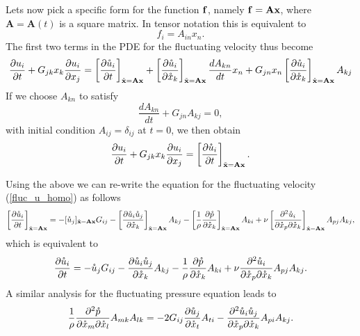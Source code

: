 \documentclass[oneside,a4paper,11pt]{report}
\begin{document}
Lets now pick a specific form for the function $\mathbf{f}$, namely $\mathbf{f} = \mathbf{A}\mathbf{x}$, where $\mathbf{A} = \mathbf{A}(t)$ is a square matrix. In tensor notation this is equivalent to
\begin{equation}
f_i = A_{in} x_n.
\end{equation}
The first two terms in the PDE for the fluctuating velocity thus become
\begin{equation}
\frac{\partial u_i}{\partial t} + G_{jk}x_k\frac{\partial u_i }{\partial x_j} = \left [ \frac{\partial \mathring{u}_i }{\partial t } \right ]_{\mathring{\mathbf{x}} = \mathbf{A}\mathbf{x}} + \left [ \frac{\partial \mathring{u}_i }{\partial \mathring{x}_k}\right ]_{\mathring{\mathbf{x}} = \mathbf{A} \mathbf{x}} \frac{d A_{kn} }{d t} x_n + G_{jn}x_n \left [ \frac{\partial \mathring{u}_i }{\partial \mathring{x}_k} \right ]_{\mathring{\mathbf{x}} = \mathbf{A} \mathbf{x}} A_{kj}
\end{equation}
If we choose $A_{kn}$ to satisfy
\begin{equation}
\label{rogallo_trans}
\frac{d A_{kn}}{dt} + G_{jn}A_{kj} = 0,
\end{equation}
with initial condition $A_{ij} = \delta_{ij}$ at $t = 0$, we then obtain 
\begin{equation}
\frac{\partial u_i }{\partial t} + G_{jk}x_k\frac{\partial u_i}{\partial x_j} = \left [ \frac{\partial \mathring{u}_i }{\partial t } \right ]_{\mathring{\mathbf{x}} = \mathbf{A} \mathbf{x}}.
\end{equation}

Using the above we can re-write the equation for the fluctuating velocity (\ref{fluc_u_homo}) as follows
\begin{equation}
\left [ \frac{\partial \mathring{u}_i }{\partial t } \right ]_{\mathring{\mathbf{x}} = \mathbf{A} \mathbf{x}} = -[\mathring{u}_j]_{\mathring{\mathbf{x}} = \mathbf{A} \mathbf{x}} G_{ij} - \left [ \frac{\partial \mathring{u}_i \mathring{u}_j}{\partial \mathring{x}_k} \right ]_{\mathring{\mathbf{x}} = \mathbf{A}\mathbf{x}} A_{kj} - \left [ \frac{1}{\rho} \frac{\partial \mathring{p} }{\partial \mathring{x}_k} \right ]_{\mathring{\mathbf{x}} = \mathbf{A}\mathbf{x} } A_{ki} + \nu \left [ \frac{ \partial^2 \mathring{u}_i}{\partial \mathring{x}_p \partial \mathring{x}_k} \right ]_{\mathring{\mathbf{x}} = \mathbf{A} \mathbf{x}} A_{pj} A_{kj},
\end{equation}
which is equivalent to
\begin{equation}
\label{eq:u_lin_tran}
\frac{\partial \mathring{u}_i }{\partial t } = -\mathring{u}_j G_{ij} - \frac{\partial \mathring{u}_i \mathring{u}_j}{\partial \mathring{x}_k} A_{kj} - \frac{1}{\rho} \frac{\partial \mathring{p} }{\partial \mathring{x}_k} A_{ki} + \nu \frac{ \partial^2 \mathring{u}_i}{\partial \mathring{x}_p \partial \mathring{x}_k} A_{pj} A_{kj}.
\end{equation}
A similar analysis for the fluctuating pressure equation leads to
\begin{equation}
\label{p_lin_tran}
\frac{1}{\rho} \frac{\partial^2 \mathring{p} }{\partial \mathring{x}_m \partial \mathring{x}_l} A_{mk} A_{lk} = -2 G_{ij} \frac{\partial \mathring{u}_j }{\partial \mathring{x}_t} A_{ti} - \frac{\partial^2 \mathring{u}_i \mathring{u}_j}{\partial \mathring{x}_p \partial \mathring{x}_k} A_{pi}A_{kj}.
\end{equation}
\end{document}
